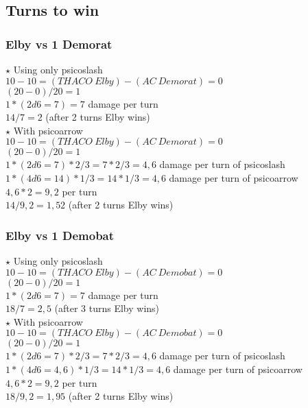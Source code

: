 \subsection{Turns to win}

\subsubsection*{Elby vs 1 Demorat}

$\star$ Using only psicoslash\\
$10-10 = (THACO\:Elby) - (AC\:Demorat) = 0$\\
$(20-0)/20 = 1$ \\
$1 * (2d6 = 7) = 7$ damage per turn\\
$14/ 7 = 2$ (after 2 turns Elby wins)\\
\newline
$\star$ With psicoarrow\\
$10-10 = (THACO\:Elby) - (AC\:Demorat) = 0$\\
$(20-0)/20 = 1$\\
$1 * (2d6 = 7) * 2/3 = 7 * 2/3 = 4,6$ damage per turn of psicoslash\\
$1 * (4d6 = 14) * 1/3 = 14 * 1/3 = 4,6$ damage per turn of psicoarrow\\
$4,6*2= 9,2$ per turn\\
$14 / 9,2 = 1,52$ (after 2 turns Elby wins)\\

\subsubsection*{Elby vs 1 Demobat}

$\star$ Using only psicoslash\\
$10-10 = (THACO\:Elby) - (AC\:Demobat) = 0$\\
$(20-0)/20 = 1$ \\
$1 * (2d6 = 7) = 7$ damage per turn\\
$18/ 7 =2,5$ (after 3 turns Elby wins)\\
\newline
$\star$ With psicoarrow\\
$10-10 = (THACO\:Elby) - (AC\:Demobat) = 0$\\
$(20-0)/20 = 1$ \\
$1 * (2d6 = 7) * 2/3  = 7 * 2/3 = 4,6$ damage per turn of psicoslash\\
$1 * (4d6 = 4,6) * 1/3 = 14 * 1/3  = 4,6$ damage per turn of psicoarrow\\
$4,6*2= 9,2$ per turn\\
$18 / 9,2 = 1,95$ (after 2 turns Elby wins)\\

